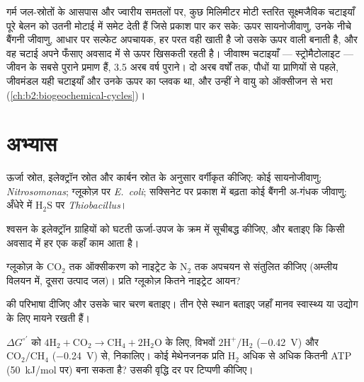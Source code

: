 \begin{remark}[सूक्ष्मजैविक चटाइयाँ और आरंभिक पृथ्वी]\label{rem:b2:microbial-metabolism:mats}
गर्म जल-स्रोतों के आसपास और ज्वारीय समतलों पर, कुछ मिलिमीटर मोटी स्तरित
सूक्ष्मजैविक चटाइयाँ पूरे बेलन को उतनी मोटाई में समेट देती हैं जिसे
प्रकाश पार कर सके: ऊपर सायनोजीवाणु, उनके नीचे बैंगनी जीवाणु, आधार पर
सल्फेट अपचायक, हर परत वही खाती है जो उसके ऊपर वाली बनाती है, और वह चटाई
अपने फँसाए अवसाद में से ऊपर खिसकती रहती है। जीवाश्म चटाइयाँ ---
स्ट्रोमैटोलाइट --- जीवन के सबसे पुराने प्रमाण हैं, \num{3.5} अरब वर्ष
पुराने। दो अरब वर्षों तक, पौधों या प्राणियों से पहले, जीवमंडल यही
चटाइयाँ और उनके ऊपर का प्लवक था, और उन्हीं ने वायु को ऑक्सीजन से भरा
(\cref{ch:b2:biogeochemical-cycles})।
\end{remark}

\section{अभ्यास}

\begin{exercise}[$\star$]\label{exo:b2:microbial-metabolism:1}
ऊर्जा स्रोत, इलेक्ट्रॉन स्रोत और कार्बन स्रोत के अनुसार वर्गीकृत कीजिए:
कोई सायनोजीवाणु; \emph{Nitrosomonas}; ग्लूकोज़ पर \emph{E.~coli};
सक्सिनेट पर प्रकाश में बढ़ता कोई बैंगनी अ-गंधक जीवाणु; अँधेरे में
$\mathrm{H_2S}$ पर \emph{Thiobacillus}।
\end{exercise}

\begin{exercise}[$\star$]\label{exo:b2:microbial-metabolism:2}
श्वसन के इलेक्ट्रॉन ग्राहियों को घटती ऊर्जा-उपज के क्रम में सूचीबद्ध
कीजिए, और बताइए कि किसी अवसाद में हर एक कहाँ काम आता है।
\end{exercise}

\begin{exercise}[$\star$]\label{exo:b2:microbial-metabolism:3}
ग्लूकोज़ के $\mathrm{CO_2}$ तक ऑक्सीकरण को नाइट्रेट के $\mathrm{N_2}$
तक अपचयन से संतुलित कीजिए (अम्लीय विलयन में, दूसरा उत्पाद जल)। प्रति
ग्लूकोज़ कितने नाइट्रेट आयन?
\end{exercise}

\begin{exercise}[$\star$]\label{exo:b2:microbial-metabolism:4}
 की परिभाषा दीजिए और उसके चार चरण बताइए। तीन ऐसे स्थान बताइए
जहाँ  मानव स्वास्थ्य या उद्योग के लिए मायने रखती हैं।
\end{exercise}

\begin{exercise}[$\star\star$]\label{exo:b2:microbial-metabolism:5}
$\Delta G^{\circ\prime}$ को $4\mathrm{H_2} + \mathrm{CO_2}
\to \mathrm{CH_4} + 2\mathrm{H_2O}$ के लिए, विभवों
$\mathrm{2H^+/H_2}$ (\qty{-0.42}{V}) और $\mathrm{CO_2/CH_4}$
(\qty{-0.24}{V}) से, निकालिए। कोई मेथेनजनक प्रति
$\mathrm{H_2}$ अधिक से अधिक कितनी ATP (\qty{50}{kJ/mol} पर) बना
सकता है? उसकी वृद्धि दर पर टिप्पणी कीजिए।
\end{exercise}

